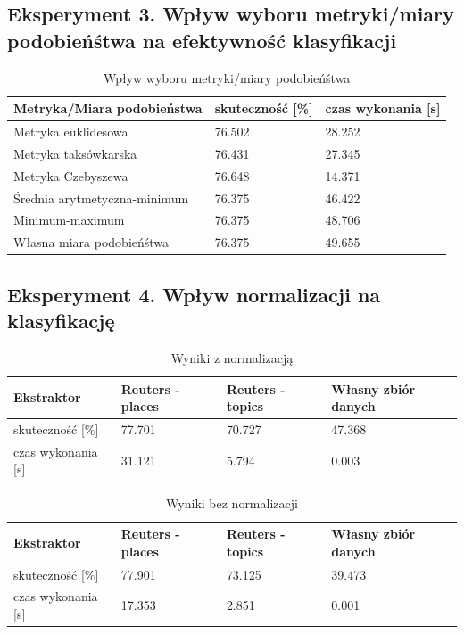 \documentclass{classrep}
\begin{document}
\subsection{Eksperyment 3. Wpływ wyboru metryki/miary podobieńśtwa na efektywność klasyfikacji}
\begin{table}[H]
	\centering
	\caption{Wpływ wyboru metryki/miary podobieńśtwa}
	\begin{tabular}{l|l|l}
		Metryka/Miara podobieństwa& skuteczność [\%] & czas wykonania [s]\\
		\hline
		Metryka euklidesowa&76.502&28.252\\
		Metryka taksówkarska&76.431&27.345\\
		Metryka Czebyszewa&76.648&14.371\\
		Średnia arytmetyczna-minimum&76.375&46.422\\
		Minimum-maximum&76.375&48.706\\
		Własna miara podobieńśtwa&76.375&49.655\\
	\end{tabular}
\end{table}

\subsection{Eksperyment 4. Wpływ normalizacji na klasyfikację}
\begin{table}[H]
	\caption{Wyniki z normalizacją}
	\begin{tabular}{l|l|l|l}
		Ekstraktor& Reuters - places & Reuters - topics & Własny zbiór danych\\
		\hline
		skuteczność [\%]   &77.701&70.727&47.368\\
		czas wykonania [s] &31.121&5.794&0.003\\
	\end{tabular}
\end{table}

\begin{table}[H]
	\caption{Wyniki bez normalizacji}
	\begin{tabular}{l|l|l|l}
		Ekstraktor& Reuters - places & Reuters - topics & Własny zbiór danych\\
		\hline
		skuteczność [\%]   &77.901&73.125&39.473\\
		czas wykonania [s] &17.353&2.851&0.001\\
	\end{tabular}
\end{table}
\end{document}
